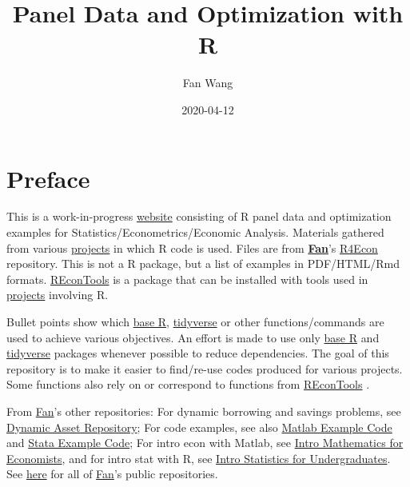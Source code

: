 \documentclass[
]{book}
\title{Panel Data and Optimization with R}
\author{Fan Wang}
\date{2020-04-12}
\begin{document}
\maketitle

{
\hypersetup{linkcolor=}
\setcounter{tocdepth}{1}
\tableofcontents
}
\hypertarget{preface}{%
\chapter*{Preface}\label{preface}}

This is a work-in-progress \href{https://fanwangecon.github.io/R4Econ/}{website} consisting of R panel data and optimization examples for Statistics/Econometrics/Economic Analysis. Materials gathered from various \href{https://fanwangecon.github.io/research}{projects} in which R code is used. Files are from \href{https://fanwangecon.github.io/}{\textbf{Fan}}'s \href{https://github.com/FanWangEcon/R4Econ}{R4Econ} repository. This is not a R package, but a list of examples in PDF/HTML/Rmd formats. \href{https://fanwangcon.github.com/REconTools}{REconTools} is a package that can be installed with tools used in \href{https://fanwangecon.github.io/research}{projects} involving R.

Bullet points show which \href{https://www.rdocumentation.org/packages/base/versions/3.5.2}{base R}, \href{https://www.tidyverse.org/}{tidyverse} or other functions/commands are used to achieve various objectives. An effort is made to use only \href{https://www.rdocumentation.org/packages/base/versions/3.5.2}{base R} \citep{R-base} and \href{https://www.tidyverse.org/}{tidyverse} \citep{R-tidyverse} packages whenever possible to reduce dependencies. The goal of this repository is to make it easier to find/re-use codes produced for various projects. Some functions also rely on or correspond to functions from \href{https://fanwangcon.github.com/REconTools}{REconTools} \citep{R-REconTools}.

From \href{https://fanwangecon.github.io/}{Fan}'s other repositories: For dynamic borrowing and savings problems, see \href{https://fanwangecon.github.io/CodeDynaAsset/}{Dynamic Asset Repository}; For code examples, see also \href{https://fanwangecon.github.io/M4Econ/}{Matlab Example Code} and \href{https://fanwangecon.github.io/Stata4Econ/}{Stata Example Code}; For intro econ with Matlab, see \href{https://fanwangecon.github.io/Math4Econ/}{Intro Mathematics for Economists}, and for intro stat with R, see \href{https://fanwangecon.github.io/Stat4Econ/}{Intro Statistics for Undergraduates}. See \href{https://github.com/FanWangEcon}{here} for all of \href{https://fanwangecon.github.io/}{Fan}'s public repositories.
\end{document}
